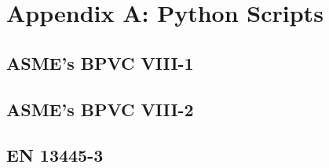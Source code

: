 \chapter{Appendix A: Python Scripts}
\label{chapt:appendixa}
\nopagebreak
\begin{small}

	\section*{ASME's BPVC VIII-1}
	
	\pagebreak
	
	\section*{ASME's BPVC VIII-2}
	
	\pagebreak
	
	\section*{EN 13445-3}
	

\end{small}